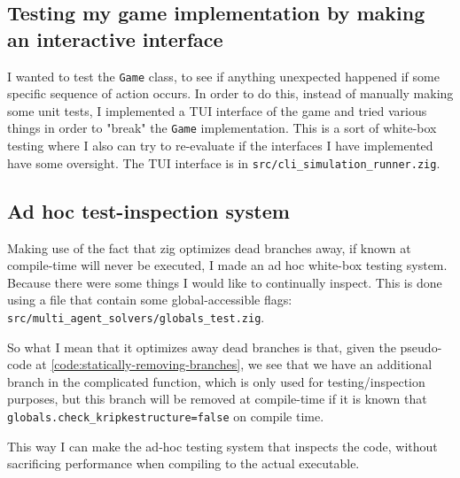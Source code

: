 \subsection{Testing my game implementation by making an interactive interface}
I wanted to test the {\tt Game} class, to see if anything unexpected happened if some specific sequence of action occurs.
In order to do this, instead of manually making some unit tests, I implemented a TUI interface of the game and tried various things in order to "break" the {\tt Game} implementation.
This is a sort of white-box testing where I also can try to re-evaluate if the interfaces I have implemented have some oversight.
The TUI interface is in {\tt src/cli\_simulation\_runner.zig}.


\subsection{Ad hoc test-inspection system}
Making use of the fact that zig optimizes dead branches away, if known at compile-time will never be executed, I made an ad hoc white-box testing system.
Because there were some things I would like to continually inspect.
This is done using a file that contain some global-accessible flags: {\tt src/multi\_agent\_solvers/globals\_test.zig}.

So what I mean that it optimizes away dead branches is that, given the pseudo-code at \ref{code:statically-removing-branches}, we see that we have an additional branch in the complicated function, which is only used for testing/inspection purposes, but this branch will be removed at compile-time if it is known that {\tt globals.check\_kripkestructure=false} on compile time.

This way I can make the ad-hoc testing system that inspects the code, without sacrificing performance when compiling to the actual executable.

\begin{verbbox}
function some_complicated_function(game, kripkestructure):
    if(globals.check_kripkestructure){
        for each element in kripkestructure{
            print(element)
        }
    }
    // function continues to do other work
}
\end{verbbox}
{\centering
\fbox{\theverbbox}
\par
\label{code:statically-removing-branches}
}


